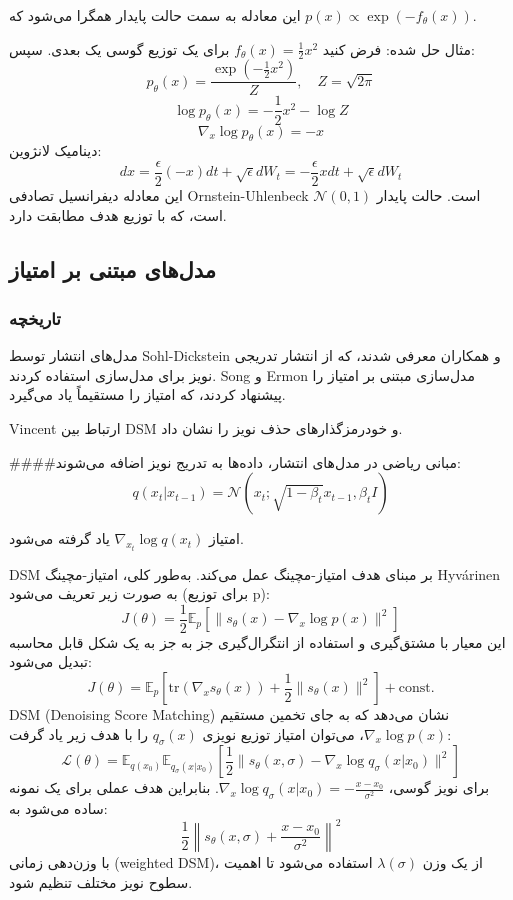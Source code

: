 این معادله به سمت حالت پایدار همگرا می‌شود که \( p(x) \propto \exp(-f_\theta(x)) \).

مثال حل شده: فرض کنید \( f_\theta(x) = \frac{1}{2} x^2 \) برای یک توزیع گوسی یک بعدی. سپس:
\[
p_\theta(x) = \frac{\exp(-\frac{1}{2} x^2)}{Z}, \quad Z = \sqrt{2\pi}
\]
\[
\log p_\theta(x) = -\frac{1}{2} x^2 - \log Z
\]
\[
\nabla_x \log p_\theta(x) = -x
\]
دینامیک لانژوین:
\[
dx = \frac{\epsilon}{2} (-x) dt + \sqrt{\epsilon} dW_t = -\frac{\epsilon}{2} x dt + \sqrt{\epsilon} dW_t
\]
این معادله دیفرانسیل تصادفی Ornstein-Uhlenbeck است. حالت پایدار \( \mathcal{N}(0,1) \) است، که با توزیع هدف مطابقت دارد.

\subsection{مدل‌های مبتنی بر امتیاز}
\subsubsection{تاریخچه}
مدل‌های انتشار توسط Sohl-Dickstein و همکاران معرفی شدند، که از انتشار تدریجی نویز برای مدل‌سازی استفاده کردند. Song و Ermon مدل‌سازی مبتنی بر امتیاز را پیشنهاد کردند، که امتیاز را مستقیماً یاد می‌گیرد.

Vincent ارتباط بین DSM و خودرمزگذارهای حذف نویز را نشان داد.

####مبانی ریاضی
در مدل‌های انتشار، داده‌ها به تدریج نویز اضافه می‌شوند:
\[
q(x_t | x_{t-1}) = \mathcal{N}(x_t; \sqrt{1 - \beta_t} x_{t-1}, \beta_t I)
\]

امتیاز \( \nabla_{x_t} \log q(x_t) \) یاد گرفته می‌شود.

DSM بر مبنای هدف امتیاز-مچینگ عمل می‌کند. به‌طور کلی، امتیاز-مچینگ Hyv\'arinen به صورت زیر تعریف می‌شود (برای توزیع p):
\[
J(\theta) = \frac{1}{2} \mathbb{E}_{p}\left[ \| s_\theta(x) - \nabla_x \log p(x) \|^2 \right]
\]
این معیار با مشتق‌گیری و استفاده از انتگرال‌گیری جز به جز به یک شکل قابل محاسبه تبدیل می‌شود:
\[
J(\theta) = \mathbb{E}_p\left[ \mathrm{tr}\left( \nabla_x s_\theta(x) \right) + \frac{1}{2} \| s_\theta(x) \|^2 \right] + \text{const.}
\]
DSM (Denoising Score Matching) نشان می‌دهد که به جای تخمین مستقیم \(\nabla_x \log p(x)\)، می‌توان امتیاز توزیع نویزی \(q_\sigma(x)\) را با هدف زیر یاد گرفت:
\[
\mathcal{L}(\theta) = \mathbb{E}_{q(x_0)} \mathbb{E}_{q_\sigma(x|x_0)} \left[ \frac{1}{2} \| s_\theta(x, \sigma) - \nabla_x \log q_\sigma(x|x_0) \|^2 \right]
\]
برای نویز گوسی، \(\nabla_x \log q_\sigma(x|x_0) = -\frac{x - x_0}{\sigma^2}\). بنابراین هدف عملی برای یک نمونه ساده می‌شود به:
\[
\frac{1}{2} \left\| s_\theta(x, \sigma) + \frac{x - x_0}{\sigma^2} \right\|^2
\]
با وزن‌دهی زمانی (weighted DSM)، از یک وزن \(\lambda(\sigma)\) استفاده می‌شود تا اهمیت سطوح نویز مختلف تنظیم شود.

